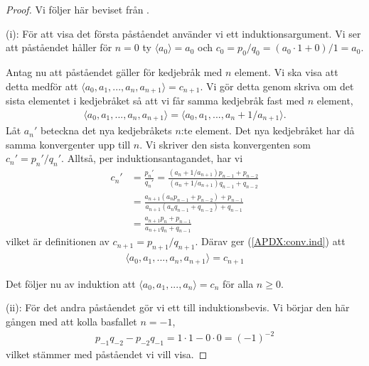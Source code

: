\begin{proof}
    Vi följer här beviset från \cite{Lindahl}.
    
    (i): För att visa det första påståendet använder vi ett induktionsargument. 
    Vi ser att påståendet håller för $n = 0$ ty \(\langle a_0 \rangle = a_0\) och \(c_0 = p_0 / q_0 = (a_0 \cdot 1 + 0) / 1 = a_0\).
    
    Antag nu att påståendet gäller för kedjebråk med $n$ element. Vi ska visa att detta medför att \(\langle a_0, a_1, ..., a_n, a_{n+1} \rangle = c_{n+1}\). Vi gör detta genom skriva om det sista elementet i kedjebråket så att vi får samma kedjebråk fast med $n$ element,
    \begin{align} \label{APDX:conv.ind}
        \langle a_0, a_1, ..., a_n, a_{n+1} \rangle = \langle a_0, a_1, ..., a_n + 1 / a_{n+1} \rangle .
    \end{align}
    Låt $a_n'$ beteckna det nya kedjebråkets $n$:te element. Det nya kedjebråket har då samma konvergenter upp till $n$. Vi skriver den sista konvergenten som $c_n' = p_n'/q_n'$. Alltså, per induktionsantagandet, har vi
    \begin{align*}
        c_{n}' &= \frac{p_n'}{q_n'} = \frac{\left( a_{n} + 1/a_{n+1} \right) p_{n-1} + p_{n-2}}{\left( a_{n} + 1/a_{n+1} \right) q_{n-1} + q_{n-2}} \\
        &= \frac{ a_{n+1} \left( a_{n} p_{n-1} + p_{n-2} \right) + p_{n-1}}{a_{n+1} \left( a_{n} q_{n-1} + q_{n-2} \right) + q_{n-1}}\\
        &= \frac{ a_{n+1} p_n + p_{n-1}}{a_{n+1} q_n + q_{n-1}} 
    \end{align*}
    vilket är definitionen av \(c_{n+1} = p_{n+1}/q_{n+1}\). Därav ger (\ref{APDX:conv.ind}) att
    \begin{align*}
        \langle a_0, a_1, ..., a_n, a_{n+1} \rangle = c_{n+1}
    \end{align*}
    
    Det följer nu av induktion att \(\langle a_0, a_1, ..., a_n \rangle = c_n\) för alla \(n \geq 0\).
    
    (ii): För det andra påståendet gör vi ett till induktionsbevis. Vi börjar den här gången med att kolla basfallet $n = -1$,
    \begin{align*}
        p_{-1} q_{-2} - p_{-2} q_{-1} = 1 \cdot 1 - 0 \cdot 0 = (-1)^{-2} 
    \end{align*}
    vilket stämmer med påståendet vi vill visa. 
    

\end{proof}
